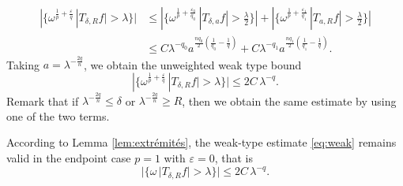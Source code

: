 \documentclass[12pt, letterpaper]{amsart}
\theoremstyle{definition}
\theoremstyle{remark}
\numberwithin{equation}{section}
\begin{document}
    \begin{align*}
        |\{\omega^{\frac{1}{p}+\frac{\varepsilon}{q}} \, |T_{\delta,R}f | >\lambda  \} | &\leq
        |\{\omega^{\frac{1}{p}+\frac{\varepsilon_0}{q_0}} \, |T_{\delta,a}f | >\frac{\lambda }{2} \} |+ |\{\omega^{\frac{1}{p}+\frac{\varepsilon_1}{q_1}} \, |T_{a,R}f | >\frac{\lambda }{2} \} |
        \\&\leq C \lambda^{-q_0}a^{\frac{n q_0}{2}(\frac{1}{q_0}-\frac{1}{q})}+ C \lambda^{-q_1}a^{\frac{n  q_1}{2}(\frac{1}{q_1}-\frac{1}{q})}.
    \end{align*}
    Taking $a=\lambda^{-\frac{2q}{n}}$, we obtain the unweighted weak type bound 
    \begin{equation}\label{eq:weak}
        |\{\omega^{\frac{1}{p}+\frac{\varepsilon}{q}} \, |T_{\delta,R}f| >\lambda  \} | \leq 2C \, \lambda^{-q}.
    \end{equation}
    Remark that if $\lambda^{-\frac{2q}{n}}\le\delta$ or $\lambda^{-\frac{2q}{n}}\ge R$, then we obtain the same estimate by using one of the two terms. 
    
    According to Lemma \ref{lem:extrémités}, the weak-type estimate \eqref{eq:weak} remains valid in the endpoint case $p = 1$ with $\varepsilon = 0$, that is 
    \begin{equation}\label{eq:weak11}
        |\{\omega \, |T_{\delta,R}f| >\lambda  \} | \leq 2C \, \lambda^{-q}.
    \end{equation}
    
    \bigskip
    
\end{document}
